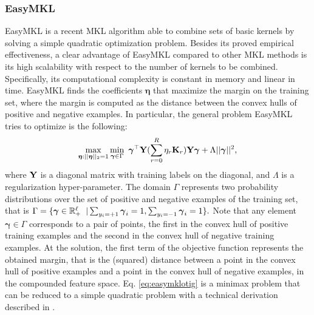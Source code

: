 \documentclass{esannV2}
\newcommand{\Real}{\mathbb{R}}
\newcommand{\KK}{{\bf K}}
\newcommand{\YY}{{\bf Y}}
\newcommand{\1}{{\bf 1}}
\newcommand{\ggamma}{\pmb{\gamma}}
\begin{document}
\subsubsection{EasyMKL}
\label{EasyMKL}
EasyMKL \cite{Aiolli2015} is a recent MKL algorithm able to combine sets of basic kernels by solving a simple quadratic optimization problem. Besides its proved empirical effectiveness, a clear advantage of EasyMKL compared to other MKL methods is its high scalability with respect to the number of kernels to be combined. Specifically, its computational complexity is constant in memory and linear in time.
EasyMKL finds the coefficients $\boldsymbol{\eta}$ that maximize the margin on the training set, where the margin is computed as the distance between the convex hulls of positive and negative examples. In particular, the general problem EasyMKL tries to optimize is the following:
\vspace{-0.4cm}
\begin{equation}
\label{eq:easymklotig}
\max_{\boldsymbol{\eta}:||\boldsymbol{\eta}||_2=1} \min_{\boldsymbol{\gamma} \in \Gamma} \mbox { }  \boldsymbol{\gamma}^{\top} \YY ( \sum_{r=0}^R \eta_r \KK_r) \YY \boldsymbol{\gamma} + \Lambda ||\boldsymbol{\gamma}||^2,
\end{equation}
where $\YY$ is a diagonal matrix with training labels on the diagonal, and $\Lambda$ is a regularization hyper-parameter. The domain $\Gamma$ represents two probability distributions over the set of positive and negative examples of the training set, that is $\Gamma = \{\boldsymbol{\gamma} \in \Real_+^{\ell} \hspace{0.2cm} |  \sum_{y_i = +1} \boldsymbol{\gamma}_i = 1 , \sum_{y_i = -1} \boldsymbol{\gamma}_i = 1\}.
$
Note that any element $\boldsymbol{\gamma} \in \Gamma$ corresponds to a pair of points, the first in the convex hull of positive training examples and the second in the convex hull of negative training examples.
At the solution, the first term of the objective function represents the obtained margin, that is the (squared) distance between a point in the convex hull of positive examples and a point in the convex hull of negative examples, in the compounded feature space.
Eq. \ref{eq:easymklotig} is a minimax problem that can be reduced  to a simple quadratic problem with a technical derivation described  in \cite{Aiolli2015}. %
\end{document}
